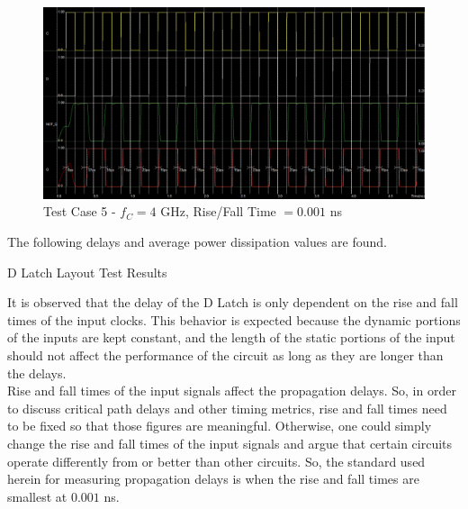 \FloatBarrier

\begin{figure}[h!]
	\centering
	\includegraphics[scale=0.30]{../images/4ghz_test_case_1.PNG}
	\caption{Test Case 5 - $f_C = 4$ \si{\giga\hertz}, Rise/Fall Time $= 0.001$ \si{\nano\second}}
	\label{fig:layout_test_5}
\end{figure}

\FloatBarrier

The following delays and average power dissipation values are found.

\FloatBarrier

\begin{table}[h!]
	\centering
	\caption{D Latch Layout Test Results}
	\label{tab:dlatch_test_results}
\end{table}

\FloatBarrier

It is observed that the delay of the D Latch is only dependent on the rise and fall times of the input clocks.
This behavior is expected because the dynamic portions of the inputs are kept constant, and the length of the static portions of the input should not affect the performance of the circuit as long as they are longer than the delays. \\

Rise and fall times of the input signals affect the propagation delays.
So, in order to discuss critical path delays and other timing metrics, rise and fall times need to be fixed so that those figures are meaningful.
Otherwise, one could simply change the rise and fall times of the input signals and argue that certain circuits operate differently from or better than other circuits.
So, the standard used herein for measuring propagation delays is when the rise and fall times are smallest at $0.001$ \si{\nano\second}. \\

